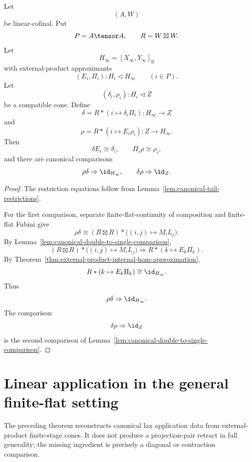 \begin{theorem}
\label{thm:lax-reconstruction-internal-hom-cones}
Let
\[
    (A,W)
\]
be linear-cofinal.  Put
\[
    P=A\tensor A,
    \qquad
    R=W\boxtimes W.
\]
Let
\[
    H_\infty=[X_\infty,Y_\infty]_{\mathrm{ff}}
\]
with external-product approximants
\[
    (E_i,\Pi_i):H_i\triangleleft H_\infty
    \qquad(i\in P).
\]
Let
\[
    (\delta_i,\rho_i):H_i\triangleleft Z
\]
be a compatible cone.  Define
\[
    \delta
    =
    R*(i\mapsto \delta_i\Pi_i):
    H_\infty\to Z
\]
and
\[
    \rho
    =
    R*(i\mapsto E_i\rho_i):
    Z\to H_\infty.
\]
Then
\[
    \delta E_i\cong \delta_i,
    \qquad
    \Pi_i\rho\cong \rho_i,
\]
and there are canonical comparisons
\[
    \rho\delta\Rightarrow \id_{H_\infty},
    \qquad
    \delta\rho\Rightarrow \id_Z.
\]
\end{theorem}

\begin{proof}
The restriction equations follow from
Lemma~\ref{lem:canonical-tail-restrictions}.

For the first comparison, separate finite-flat-continuity of composition and
finite-flat Fubini give
\[
    \rho\delta
    \cong
    (R\boxtimes R)*
    \bigl((i,j)\mapsto M_iL_j\bigr).
\]
By Lemma~\ref{lem:canonical-double-to-single-comparison},
\[
    (R\boxtimes R)*
    \bigl((i,j)\mapsto M_iL_j\bigr)
    \Rightarrow
    R*(k\mapsto E_k\Pi_k).
\]
By Theorem~\ref{thm:external-product-internal-hom-approximation},
\[
    R*(k\mapsto E_k\Pi_k)
    \cong
    \id_{H_\infty}.
\]
Thus
\[
    \rho\delta\Rightarrow\id_{H_\infty}.
\]
The comparison
\[
    \delta\rho\Rightarrow \id_Z
\]
is the second comparison of
Lemma~\ref{lem:canonical-double-to-single-comparison}.
\end{proof}

\section{Linear application in the general finite-flat setting}
\label{sec:linear-application-general-ff}

The preceding theorem reconstructs canonical lax application data from
external-product finite-stage cones.  It does not produce a projection-pair
retract in full generality; the missing ingredient is precisely a diagonal or
contraction comparison.

